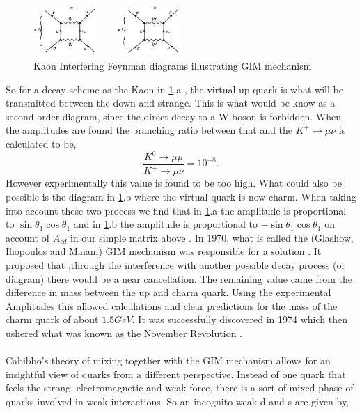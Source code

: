\begin{figure}[h]
\centering
\includegraphics[width=0.5\textwidth]{figs/ckmfig3.jpg}
\caption{Kaon Interfering Feynman diagrams illustrating GIM mechanism}
\label{fey2}
\end{figure}


So for a decay scheme as the Kaon in \cref{fey2}.a , the virtual up quark is what will be transmitted between the down and strange. This is what would be know as a second order diagram, since the direct decay to a W boson is forbidden. When the amplitudes are found the branching ratio between that and the $K^+\rightarrow\mu\nu$ is calculated to be,
\begin{equation}\label{mat3}
 \frac{K^0\rightarrow\mu\mu}{K^+\rightarrow\mu\nu}=10^{-8}.
\end{equation}
However experimentally this value is found to be too high. What could also be possible is the diagram in \cref{fey2}.b where the virtual quark is now charm. When taking into account these two process we find that in \cref{fey2}.a the amplitude is proportional to $\sin\theta_1 \cos\theta_1$ and in \cref{fey2}.b the amplitude is proportional to $-\sin\theta_1 \cos\theta_1$ on account of $A_{cd}$ in our simple matrix above \cite{CKM5}. 
In 1970, what is called the (Glashow, Iliopoulos and Maiani) GIM mechanism was responsible for a solution \cite{CKM9}. It proposed that ,through the interference with another possible decay process (or diagram) there would be a near cancellation. The remaining value came from the difference in mass between the up and charm quark. Using the experimental Amplitudes this allowed calculations and clear predictions for the mass of the charm quark of about $1.5GeV$. It was successfully discovered in 1974 which then ushered what was known as the November Revolution \cite{CKM2}.
 \\
\\
Cabibbo's theory of mixing together with the GIM mechanism allows for an insightful view of quarks from a different perspective. Instead of one quark that feels the strong, electromagnetic and weak force, there is a sort of mixed phase of quarks involved in weak interactions. So an incognito weak d and s are given by,

